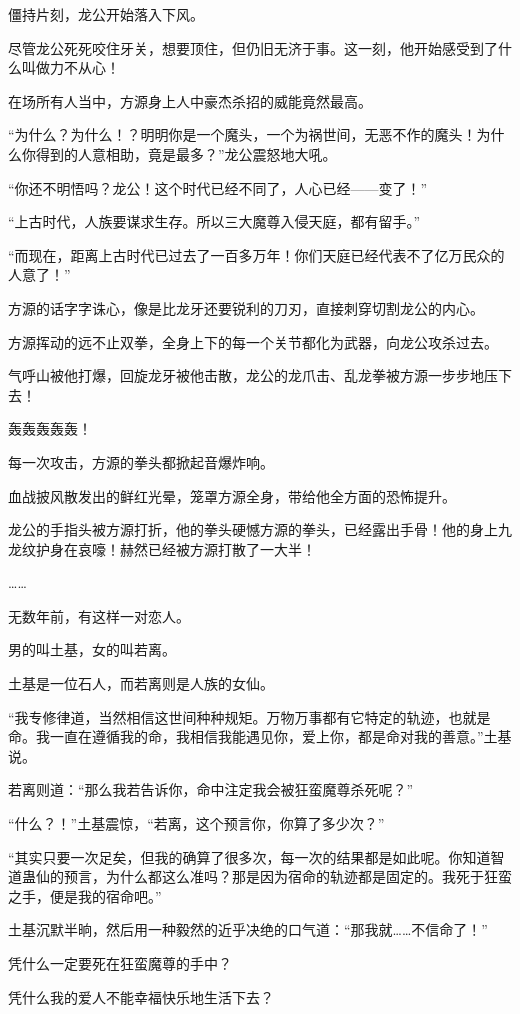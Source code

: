 \begin{this_body}
僵持片刻，龙公开始落入下风。

尽管龙公死死咬住牙关，想要顶住，但仍旧无济于事。这一刻，他开始感受到了什么叫做力不从心！

在场所有人当中，方源身上人中豪杰杀招的威能竟然最高。

“为什么？为什么！？明明你是一个魔头，一个为祸世间，无恶不作的魔头！为什么你得到的人意相助，竟是最多？”龙公震怒地大吼。

“你还不明悟吗？龙公！这个时代已经不同了，人心已经——变了！”

“上古时代，人族要谋求生存。所以三大魔尊入侵天庭，都有留手。”

“而现在，距离上古时代已过去了一百多万年！你们天庭已经代表不了亿万民众的人意了！”

方源的话字字诛心，像是比龙牙还要锐利的刀刃，直接刺穿切割龙公的内心。

方源挥动的远不止双拳，全身上下的每一个关节都化为武器，向龙公攻杀过去。

气呼山被他打爆，回旋龙牙被他击散，龙公的龙爪击、乱龙拳被方源一步步地压下去！

轰轰轰轰轰！

每一次攻击，方源的拳头都掀起音爆炸响。

血战披风散发出的鲜红光晕，笼罩方源全身，带给他全方面的恐怖提升。

龙公的手指头被方源打折，他的拳头硬憾方源的拳头，已经露出手骨！他的身上九龙纹护身在哀嚎！赫然已经被方源打散了一大半！

……

无数年前，有这样一对恋人。

男的叫土基，女的叫若离。

土基是一位石人，而若离则是人族的女仙。

“我专修律道，当然相信这世间种种规矩。万物万事都有它特定的轨迹，也就是命。我一直在遵循我的命，我相信我能遇见你，爱上你，都是命对我的善意。”土基说。

若离则道：“那么我若告诉你，命中注定我会被狂蛮魔尊杀死呢？”

“什么？！”土基震惊，“若离，这个预言你，你算了多少次？”

“其实只要一次足矣，但我的确算了很多次，每一次的结果都是如此呢。你知道智道蛊仙的预言，为什么都这么准吗？那是因为宿命的轨迹都是固定的。我死于狂蛮之手，便是我的宿命吧。”

土基沉默半晌，然后用一种毅然的近乎决绝的口气道：“那我就……不信命了！”

凭什么一定要死在狂蛮魔尊的手中？

凭什么我的爱人不能幸福快乐地生活下去？


\end{this_body}
